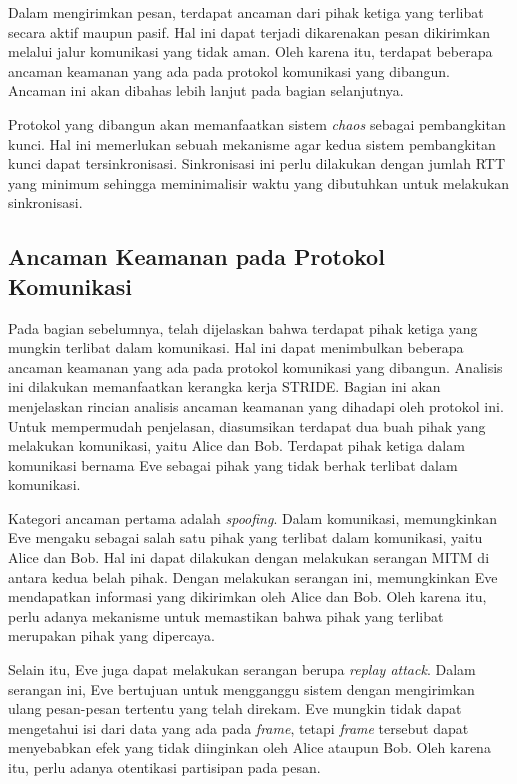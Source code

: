 Dalam mengirimkan pesan, terdapat ancaman dari pihak ketiga yang terlibat secara aktif maupun pasif. Hal ini dapat terjadi dikarenakan pesan dikirimkan melalui jalur komunikasi yang tidak aman. Oleh karena itu, terdapat beberapa ancaman keamanan yang ada pada protokol komunikasi yang dibangun. Ancaman ini akan dibahas lebih lanjut pada bagian selanjutnya.

Protokol yang dibangun akan memanfaatkan sistem \emph{chaos} sebagai pembangkitan kunci. Hal ini memerlukan sebuah mekanisme agar kedua sistem pembangkitan kunci dapat tersinkronisasi. Sinkronisasi ini perlu dilakukan dengan jumlah RTT yang minimum sehingga meminimalisir waktu yang dibutuhkan untuk melakukan sinkronisasi. 

\subsection{Ancaman Keamanan pada Protokol Komunikasi}

Pada bagian sebelumnya, telah dijelaskan bahwa terdapat pihak ketiga yang mungkin terlibat dalam komunikasi. Hal ini dapat menimbulkan beberapa ancaman keamanan yang ada pada protokol komunikasi yang dibangun. Analisis ini dilakukan memanfaatkan kerangka kerja STRIDE. Bagian ini akan menjelaskan rincian analisis ancaman keamanan yang dihadapi oleh protokol ini. Untuk mempermudah penjelasan, diasumsikan terdapat dua buah pihak yang melakukan komunikasi, yaitu Alice dan Bob. Terdapat pihak ketiga dalam komunikasi bernama Eve sebagai pihak yang tidak berhak terlibat dalam komunikasi. %

Kategori ancaman pertama adalah \emph{spoofing}. Dalam komunikasi, memungkinkan Eve mengaku sebagai salah satu pihak yang terlibat dalam komunikasi, yaitu Alice dan Bob. Hal ini dapat dilakukan dengan melakukan serangan MITM di antara kedua belah pihak. Dengan melakukan serangan ini, memungkinkan Eve mendapatkan informasi yang dikirimkan oleh Alice dan Bob. Oleh karena itu, perlu adanya mekanisme untuk memastikan bahwa pihak yang terlibat merupakan pihak yang dipercaya.

Selain itu, Eve juga dapat melakukan serangan berupa \emph{replay attack}. Dalam serangan ini, Eve bertujuan untuk mengganggu sistem dengan mengirimkan ulang pesan-pesan tertentu yang telah direkam. Eve mungkin tidak dapat mengetahui isi dari data yang ada pada \emph{frame}, tetapi \emph{frame} tersebut dapat menyebabkan efek yang tidak diinginkan oleh Alice ataupun Bob. Oleh karena itu, perlu adanya otentikasi partisipan pada pesan.

